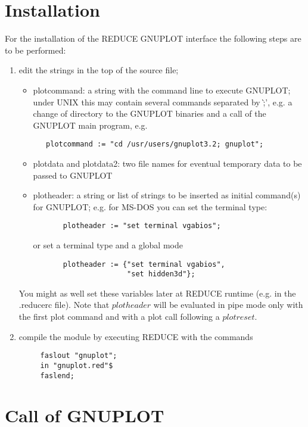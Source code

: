 \section{Installation}
For the installation of the {\small REDUCE} GNUPLOT
interface the following steps are to be performed:
\begin{enumerate}
\item  edit the strings in the top of the source file;
\begin{itemize}
\item{plotcommand:} a string with the command line to execute GNUPLOT;
under UNIX this may contain several commands separated by \`;', e.g.
a change of directory to the GNUPLOT binaries and a call of the
GNUPLOT main program, e.g.
\begin{verbatim}
   plotcommand := "cd /usr/users/gnuplot3.2; gnuplot";
\end{verbatim}
\item{plotdata and plotdata2:} two file names for eventual temporary 
data to be passed to GNUPLOT
\item{plotheader:} a string or list of strings to be inserted as initial
      command(s) for GNUPLOT; e.g. for MS-DOS you can set the terminal type:
\begin{verbatim}
       plotheader := "set terminal vgabios";
\end{verbatim}
or set a terminal type and a global mode
\begin{verbatim}
       plotheader := {"set terminal vgabios",
                      "set hidden3d"};
\end{verbatim}

\end{itemize}
You might as well set these variables later at
{\small REDUCE} runtime (e.g. in the .reducerc file).
Note that $plotheader$ will be evaluated in pipe mode only with the
first plot command and with a plot call following a $plotreset$.

\item compile the module by executing {\small REDUCE} with
the commands
\begin{verbatim}
     faslout "gnuplot";
     in "gnuplot.red"$
     faslend; 
\end{verbatim}
\end{enumerate}

\section{Call of GNUPLOT}
 
